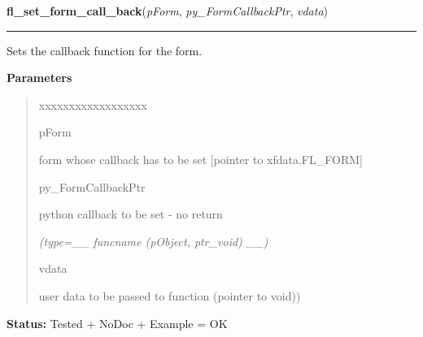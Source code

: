 \hspace{.8\funcindent}\begin{boxedminipage}{\funcwidth}

    \raggedright \textbf{fl\_set\_form\_call\_back}(\textit{pForm}, \textit{py\_FormCallbackPtr}, \textit{vdata})

    \vspace{-1.5ex}

    \rule{\textwidth}{0.5\fboxrule}
\setlength{\parskip}{2ex}
    Sets the callback function for the form.

\setlength{\parskip}{1ex}
      \textbf{Parameters}
      \vspace{-1ex}

      \begin{quote}
        \begin{Ventry}{xxxxxxxxxxxxxxxxxx}

          \item[pForm]

          form whose callback has to be set [pointer to xfdata.FL\_FORM]

          \item[py\_FormCallbackPtr]

          python callback to be set - no return

            {\it (type=\_\_ funcname (pObject, ptr\_void) \_\_)}

          \item[vdata]

          user data to be passed to function (pointer to void))

        \end{Ventry}

      \end{quote}

\textbf{Status:} Tested + NoDoc + Example = OK



    \end{boxedminipage}

    \label{xformslib:library:fl_set_form_size}

    \vspace{0.5ex}

